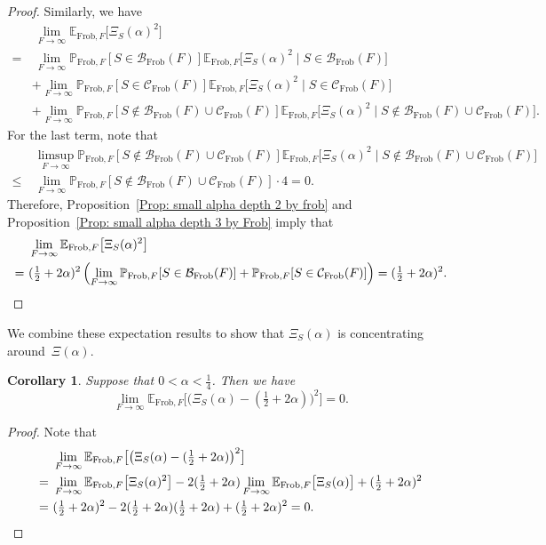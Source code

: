 \documentclass[12pt]{amsart}
\def\B{{\mathcal B}}
\def\E{{\mathbb E}}
\renewcommand{\P}{\mathbb{P}}
\newcommand{\cC}{\mathcal{C}}
\newcommand{\Frob}{\text{Frob}}
\newtheorem{corollary}[theorem]{Corollary}
\begin{document}
\begin{proof}
Similarly, we have
\begin{align*}
&\ \lim_{F\to\infty} \E_{\Frob,F} \big[\Xi_S(\alpha)^2\big]\\ 
= &\  \lim_{F\to\infty} \P_{\Frob,F}[S\in \B_{\Frob}(F)] \E_{\Frob,F} \big[\Xi_S(\alpha)^2 \mid S\in \B_{\Frob}(F)\big]\\
& +\lim_{F\to\infty}\P_{\Frob,F}[S\in \cC_{\Frob}(F)] \E_{\Frob,F} \big[\Xi_S(\alpha)^2 \mid S\in \cC_{\Frob}(F)\big]\\
& +\lim_{F\to\infty}\P_{\Frob,F}[S\notin \B_{\Frob}(F)\cup\cC_{\Frob}(F)] \E_{\Frob,F} \big[\Xi_S(\alpha)^2 \mid S\notin \B_{\Frob}(F)\cup\cC_{\Frob}(F)\big].
\end{align*}
For the last term, note that
\begin{align*}
&\ \limsup_{F\to\infty}\P_{\Frob,F}[S\notin \B_{\Frob}(F)\cup\cC_{\Frob}(F)] \E_{\Frob,F} \big[\Xi_S(\alpha)^2 \mid S\notin \B_{\Frob}(F)\cup\cC_{\Frob}(F)\big]\\
\leq &\  \lim_{F\to\infty}\P_{\Frob,F}[S\notin \B_{\Frob}(F)\cup\cC_{\Frob}(F)] \cdot 4 =0.
\end{align*}
Therefore, Proposition~\ref{Prop: small alpha depth 2 by frob} and Proposition~\ref{Prop: small alpha depth 3 by Frob} imply that 
\begin{align*}
&\ \lim_{F\to\infty} \E_{\Frob,F} \big[\Xi_S(\alpha)^2\big]\\
= &\  (\tfrac{1}{2}+2\alpha )^2 \left(\lim_{F\to\infty} \P_{\Frob,F}[S\in \B_{\Frob}(F)] 
+\P_{\Frob,F}[S\in \cC_{\Frob}(F)] \right)
=(\tfrac{1}{2}+2\alpha )^2.\qedhere
\end{align*}
\end{proof}

We combine these expectation results to show that $\Xi_S(\alpha)$ is concentrating around~$\Xi(\alpha)$.

\begin{corollary}\label{Cor: small alpha exp concentration by Frob}
Suppose that $0<\alpha<\frac{1}{4}$.
Then we have
\[\lim_{F\to\infty} \E_{\Frob,F} \big[ \big(\Xi_S(\alpha) -(\tfrac12+2\alpha) \big)^2\big] = 0. \]
\end{corollary}
\begin{proof}
Note that
\begin{align*}
&\ \lim_{F\to\infty} \E_{\Frob,F} \big[ \big(\Xi_S(\alpha) -(\tfrac12+2\alpha) \big)^2\big]\\
=&\ \lim_{F\to\infty} \E_{\Frob,F} \big[ \Xi_S(\alpha)^2\big]
-2(\tfrac12+2\alpha)\lim_{F\to\infty} \E_{\Frob,F} \big[ \Xi_S(\alpha) \big]
+ (\tfrac12+2\alpha)^2\\
=&\ (\tfrac12+2\alpha)^2
-2(\tfrac12+2\alpha)(\tfrac12+2\alpha)
+ (\tfrac12+2\alpha)^2 = 0. \qedhere
\end{align*}
\end{proof}
\end{document}
